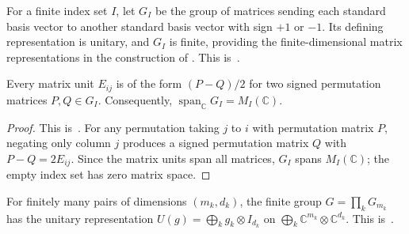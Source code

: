 \begin{definition}%
    \label{def:peps_signed_permutation_representation}
    \leanok
    For a finite index set $I$, let $G_I$ be the group of matrices sending
    each standard basis vector to another standard basis vector with sign
    $+1$ or $-1$. Its defining representation is unitary, and $G_I$ is finite,
    providing the finite-dimensional matrix representations in the construction
    of \cite[Theorem~4.1]{Schuch2010PEPS}.
    This is~\cite[``Finite signed permutation
        representations'']{QICLean2026Blueprint}.
\end{definition}

\begin{lemma}%
    \label{thm:peps_signed_permutation_span}
    \leanok
    Every matrix unit $E_{ij}$ is of the form $(P-Q)/2$ for two signed
    permutation matrices $P,Q\in G_I$. Consequently,
    $\operatorname{span}_{\mathbb C}G_I=M_I(\mathbb C)$.
\end{lemma}

\begin{proof}\leanok
    This is~\cite[``Matrix units from signed
        permutations'']{QICLean2026Blueprint}.
    For any permutation taking $j$ to $i$ with permutation matrix $P$,
    negating only column $j$ produces a signed permutation matrix $Q$ with
    $P-Q=2E_{ij}$. Since the matrix units span all matrices, $G_I$ spans
    $M_I(\mathbb C)$; the empty index set has zero matrix space.
\end{proof}

\begin{definition}%
    \label{def:peps_block_signed_permutation_representation}
    \leanok
    For finitely many pairs of dimensions $(m_k,d_k)$, the finite group
    $G=\prod_kG_{m_k}$ has the unitary representation
    $U(g)=\bigoplus_k g_k\otimes I_{d_k}$ on
    $\bigoplus_k\mathbb C^{m_k}\otimes\mathbb C^{d_k}$.
    This is~\cite[``Independent groups on multiplicity
        factors'']{QICLean2026Blueprint}.
\end{definition}

